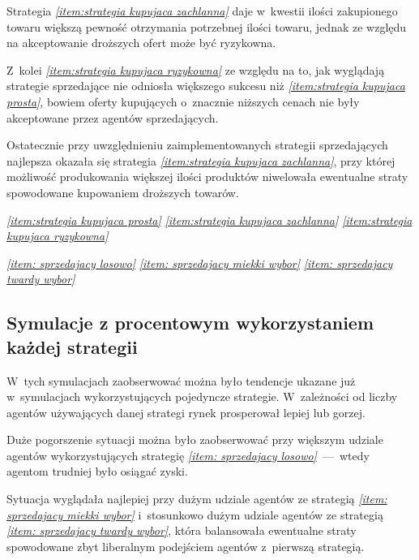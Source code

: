 \documentclass[12pt]{article}
\begin{document}
Strategia \emph{\ref{item:strategia kupujaca zachlanna}} daje w~kwestii ilości zakupionego towaru większą pewność otrzymania potrzebnej ilości towaru, jednak ze względu na akceptowanie droższych ofert może być ryzykowna.

Z~kolei \emph{\ref{item:strategia kupujaca ryzykowna}} ze względu na to, jak wyglądają strategie sprzedające nie odniosła większego sukcesu niż \emph{\ref{item:strategia kupujaca prosta}}, bowiem oferty kupujących
o~znacznie niższych cenach nie były akceptowane przez agentów sprzedających.

Ostatecznie przy uwzględnieniu zaimplementowanych strategii sprzedających najlepsza okazała się strategia \emph{\ref{item:strategia kupujaca zachlanna}}, przy której możliwość produkowania większej ilości produktów
niwelowała ewentualne straty spowodowane kupowaniem droższych towarów.


\emph{\ref{item:strategia kupujaca prosta}}
\emph{\ref{item:strategia kupujaca zachlanna}}
\emph{\ref{item:strategia kupujaca ryzykowna}}

\emph{\ref{item: sprzedajacy losowo}}
\emph{\ref{item: sprzedajacy miekki wybor}}
\emph{\ref{item: sprzedajacy twardy wybor}}

\subsection{Symulacje z procentowym wykorzystaniem każdej strategii}
W~tych symulacjach zaobserwować można było tendencje ukazane już w~symulacjach wykorzystujących pojedyncze strategie. W~zależności od liczby agentów używających danej strategi rynek prosperował lepiej lub gorzej.

Duże pogorszenie sytuacji można było zaobserwować przy większym udziale agentów wykorzystujących strategię \emph{\ref{item: sprzedajacy losowo}}~---~wtedy agentom trudniej było osiągać zyski.

Sytuacja wyglądała najlepiej przy dużym udziale agentów ze strategią \emph{\ref{item: sprzedajacy miekki wybor}} i~stosunkowo dużym udziale agentów ze strategią \emph{\ref{item: sprzedajacy twardy wybor}}, która
balansowała ewentualne straty spowodowane zbyt liberalnym podejściem agentów z~pierwszą strategią.
\end{document}

